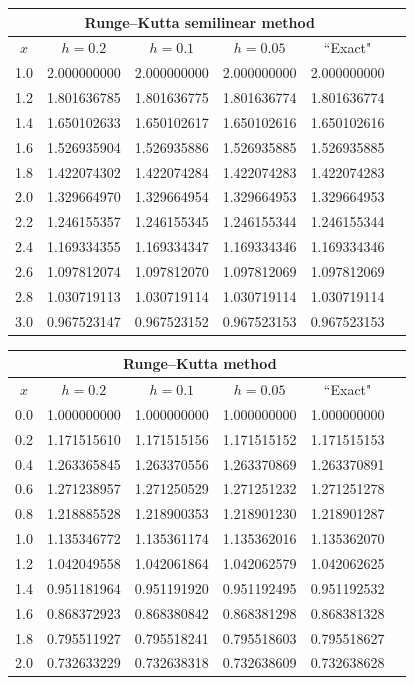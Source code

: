 \documentclass[dvips]{book}
\renewcommand{\exer}[1]{\par\medskip\;\noindent{\color{red}\bf #1.}}
\numberwithin{example}{section}
\numberwithin{equation}{section}
\numberwithin{theorem}{section}
\numberwithin{table}{section}
\numberwithin{figure}{section}
\begin{document}
{\small
\begin{tabular}{|c|r|r|r|r|r|}
\hline
\multicolumn{5}{|c|}{Runge--Kutta semilinear method}\\\hline
\multicolumn{1}{|c|}{$x$}&
\multicolumn{1}{|c|}{$h=0.2$}&
\multicolumn{1}{|c|}{$h=0.1$}&
\multicolumn{1}{|c|}{$h=0.05$}&
\multicolumn{1}{|c|}{``Exact"}\\ \hline
1.0 & 2.000000000 & 2.000000000 & 2.000000000 & 2.000000000 \\
1.2 & 1.801636785 & 1.801636775 & 1.801636774 & 1.801636774 \\
1.4 & 1.650102633 & 1.650102617 & 1.650102616 & 1.650102616 \\
1.6 & 1.526935904 & 1.526935886 & 1.526935885 & 1.526935885 \\
1.8 & 1.422074302 & 1.422074284 & 1.422074283 & 1.422074283 \\
2.0 & 1.329664970 & 1.329664954 & 1.329664953 & 1.329664953 \\
2.2 & 1.246155357 & 1.246155345 & 1.246155344 & 1.246155344 \\
2.4 & 1.169334355 & 1.169334347 & 1.169334346 & 1.169334346 \\
2.6 & 1.097812074 & 1.097812070 & 1.097812069 & 1.097812069 \\
2.8 & 1.030719113 & 1.030719114 & 1.030719114 & 1.030719114 \\
3.0 & 0.967523147 & 0.967523152 & 0.967523153 & 0.967523153 \\
\hline
\end{tabular}}


\exer{3.3.18}
{\small
\begin{tabular}{|c|r|r|r|r|r|}
\hline
\multicolumn{5}{|c|}{Runge--Kutta method}\\\hline
\multicolumn{1}{|c|}{$x$}&
\multicolumn{1}{|c|}{$h=0.2$}&
\multicolumn{1}{|c|}{$h=0.1$}&
\multicolumn{1}{|c|}{$h=0.05$}&
\multicolumn{1}{|c|}{``Exact"}\\ \hline
0.0 & 1.000000000 & 1.000000000 & 1.000000000 & 1.000000000 \\
0.2 & 1.171515610 & 1.171515156 & 1.171515152 & 1.171515153 \\
0.4 & 1.263365845 & 1.263370556 & 1.263370869 & 1.263370891 \\
0.6 & 1.271238957 & 1.271250529 & 1.271251232 & 1.271251278 \\
0.8 & 1.218885528 & 1.218900353 & 1.218901230 & 1.218901287 \\
1.0 & 1.135346772 & 1.135361174 & 1.135362016 & 1.135362070 \\
1.2 & 1.042049558 & 1.042061864 & 1.042062579 & 1.042062625 \\
1.4 & 0.951181964 & 0.951191920 & 0.951192495 & 0.951192532 \\
1.6 & 0.868372923 & 0.868380842 & 0.868381298 & 0.868381328 \\
1.8 & 0.795511927 & 0.795518241 & 0.795518603 & 0.795518627 \\
2.0 & 0.732633229 & 0.732638318 & 0.732638609 & 0.732638628 \\
\hline
\end{tabular}}
\end{document}
